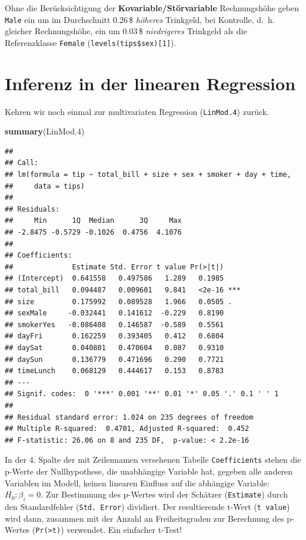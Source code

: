 \documentclass[12pt,ngerman,paper=a4,pagesize,DIV=13]{scrreprt}
\newenvironment{Shaded}{\begin{snugshade}}{\end{snugshade}}
\newcommand{\FloatTok}[1]{\textcolor[rgb]{0.00,0.00,0.81}{#1}}
\newcommand{\KeywordTok}[1]{\textcolor[rgb]{0.13,0.29,0.53}{\textbf{#1}}}
\newcommand{\NormalTok}[1]{#1}
\begin{document}
Ohne die Berücksichtigung der \textbf{Kovariable/Störvariable}
Rechnungshöhe geben \texttt{Male} ein um im Durchschnitt 0.26\(\,\)\$
\emph{höheres} Trinkgeld, bei Kontrolle, d.~h. gleicher Rechnungshöhe,
ein um 0.03\(\,\)\$ \emph{niedrigeres} Trinkgeld als die Referenzklasse
\texttt{Female} (\texttt{levels(tips\$sex){[}1{]}}).

\hypertarget{inferenz-in-der-linearen-regression}{%
\section{Inferenz in der linearen
Regression}\label{inferenz-in-der-linearen-regression}}

Kehren wir noch einmal zur multivariaten Regression (\texttt{LinMod.4})
zurück.

\begin{Shaded}
\begin{Highlighting}[]
\KeywordTok{summary}\NormalTok{(LinMod}\FloatTok{.4}\NormalTok{)}
\end{Highlighting}
\end{Shaded}

\begin{verbatim}
## 
## Call:
## lm(formula = tip ~ total_bill + size + sex + smoker + day + time, 
##     data = tips)
## 
## Residuals:
##     Min      1Q  Median      3Q     Max 
## -2.8475 -0.5729 -0.1026  0.4756  4.1076 
## 
## Coefficients:
##              Estimate Std. Error t value Pr(>|t|)    
## (Intercept)  0.641558   0.497586   1.289   0.1985    
## total_bill   0.094487   0.009601   9.841   <2e-16 ***
## size         0.175992   0.089528   1.966   0.0505 .  
## sexMale     -0.032441   0.141612  -0.229   0.8190    
## smokerYes   -0.086408   0.146587  -0.589   0.5561    
## dayFri       0.162259   0.393405   0.412   0.6804    
## daySat       0.040801   0.470604   0.087   0.9310    
## daySun       0.136779   0.471696   0.290   0.7721    
## timeLunch    0.068129   0.444617   0.153   0.8783    
## ---
## Signif. codes:  0 '***' 0.001 '**' 0.01 '*' 0.05 '.' 0.1 ' ' 1
## 
## Residual standard error: 1.024 on 235 degrees of freedom
## Multiple R-squared:  0.4701, Adjusted R-squared:  0.452 
## F-statistic: 26.06 on 8 and 235 DF,  p-value: < 2.2e-16
\end{verbatim}

In der 4. Spalte der mit Zeilennamen versehenen Tabelle
\texttt{Coefficients} stehen die p-Werte der Nullhypothese, die
unabhängige Variable hat, gegeben alle anderen Variablen im Modell,
keinen linearen Einfluss auf die abhängige Variable: \(H_0: \beta_i=0\).
Zur Bestimmung des p-Wertes wird der Schätzer (\texttt{Estimate}) durch
den Standardfehler (\texttt{Std.\ Error}) dividiert. Der resultierende
t-Wert (\texttt{t\ value}) wird dann, zusammen mit der Anzahl an
Freiheitsgraden zur Berechnung des p-Wertes
(\texttt{Pr(\textgreater{}\textbar{}t\textbar{})}) verwendet. Ein
einfacher t-Test!
\end{document}
